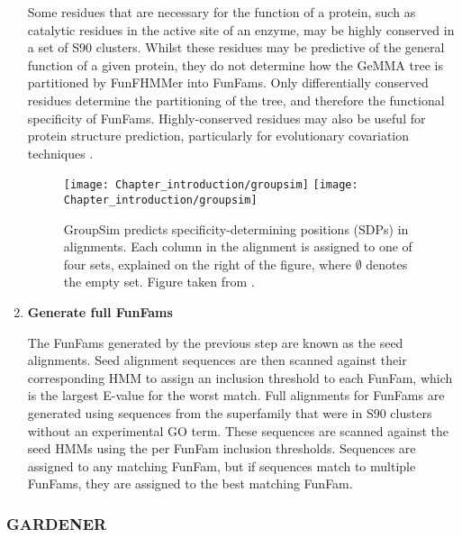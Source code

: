 \begin{enumerate}
        Some residues that are necessary for the function of a protein, such as catalytic residues in the active site of an enzyme, may be highly conserved in a set of S$90$ clusters. Whilst these residues may be predictive of the general function of a given protein, they do not determine how the GeMMA tree is partitioned by FunFHMMer into FunFams. Only differentially conserved residues determine the partitioning of the tree, and therefore the functional specificity of FunFams. Highly-conserved residues may also be useful for protein structure prediction, particularly for evolutionary covariation techniques \cite{Marks2011,Senior2020}.

        \begin{figure}[!hbt]
            \centering
            \ifredact
                \texttt{[image: Chapter\_introduction/groupsim]}
            \else
                \texttt{[image: Chapter\_introduction/groupsim]}
            \fi
            \caption{%
                GroupSim predicts specificity-determining positions (SDPs) in alignments.
                Each column in the alignment is assigned to one of four sets, explained on the right of the figure,
                where $\emptyset$ denotes the empty set.
                Figure taken from \cite{Capra2008}.
            }
            \label{fig:groupsim}
        \end{figure}

    \item
        \textbf{Generate full FunFams}

        The FunFams generated by the previous step are known as the seed alignments.
        Seed alignment sequences are then scanned against their corresponding HMM to assign an inclusion threshold to each FunFam, which is the largest E-value for the worst match.
        Full alignments for FunFams are generated using sequences from the superfamily that were in S$90$ clusters without an experimental GO term. These sequences are scanned against the seed HMMs using the per FunFam inclusion thresholds. Sequences are assigned to any matching FunFam, but if sequences match to multiple FunFams, they are assigned to the best matching FunFam.
\end{enumerate}


\subsubsection{GARDENER}
\label{sec:intro-gardener}

